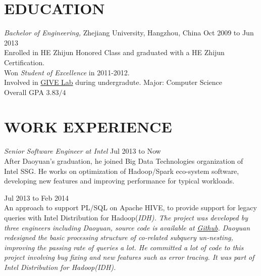 \documentclass[line,margin]{res}
\begin{document}
\address{Cellphone:\sl +86-152-1686-1267}
\address{E-mail:\sl me at daoyuan.wang}


\begin{resume}

\section{EDUCATION} {\sl Bachelor of Engineering,} Zhejiang University, Hangzhou, China \hfill Oct 2009 to Jun 2013\\
                Enrolled in HE Zhijun Honored Class and graduated with a HE Zhijun Certification.\\
                Won {\sl Student of Excellence} in 2011-2012.\\
                Involved in \href{http://give.zju.edu.cn/en/portal/index.html}{GIVE Lab} during undergradute.
                Major: Computer Science \\
                Overall GPA $3.83/4$

\section{WORK EXPERIENCE}
    {\sl Senior Software Engineer at Intel} \hfill         Jul 2013 to Now\\
    After Daoyuan's graduation, he joined Big Data Technologies organization of Intel SSG. He works on optimization of Hadoop/Spark eco-system software, developing new features and improving performance for typical workloads.
        \begin{outline}
             \hfill        Jul 2013 to Feb 2014\\
                An approach to support PL/SQL on Apache HIVE, to provide support for legacy queries with Intel Distribution for Hadoop(\sl IDH). The project was developed by three engineers including Daoyuan, source code is available at \href{https://github.com/intel-hadoop/project-panthera}{Github}. Daoyuan redesigned the basic processing structure of co-related subquery un-nesting, improving the passing rate of queries a lot. He committed a lot of code to this project involving bug fixing and new features such as error tracing. It was part of Intel Distribution for Hadoop(\sl IDH).


\end{outline}
\end{resume}
\end{document}
